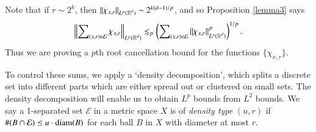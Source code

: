\begin{remark}
    Note that if $r \sim 2^k$, then $\| \chi_{x,r} \|_{L^p(\operatorname{\mathbb{R}}^d)} \sim 2^{k(d-1)/p}$, and so Proposition \ref{lemma3} says
    \begin{equation}
      \left\| \sum\nolimits_{(x,r) \in \mathcal{E}} \chi_{x,r} \right\|_{L^p(\operatorname{\mathbb{R}}^d)} \lesssim_p \left( \sum\nolimits_{(x,r) \in \mathcal{E}} \| \chi_{x,r} \|_{L^p(\operatorname{\mathbb{R}}^d)}^p \right)^{1/p}.
    \end{equation}
    Thus we are proving a $p$th root cancellation bound for the functions $\{ \chi_{x,r} \}$.
\end{remark}

\begin{comment}
\begin{proof}[Proof of Lemma \ref{lemma2} from Lemma \ref{lemma3}]
    Let
    \[ F = \sum\nolimits_{(x,r) \in \mathcal{E}} \chi_{x,r} \]
    and then for $k \geq 1$, let
    \[ F_k = \sum\nolimits_{(x,r) \in \mathcal{E}_k} \chi_{x,r}. \]
    Then $F = \sum\nolimits_k F_k$, and. Applying a dyadic interpolation result (Lemma 2.2 of that paper), the bound
    \[ \| F_k \|_{L^r(\RR^d)} \lesssim 2^k (2^{k(d-r-1)} \#(\mathcal{E}_k)^{1/r}) \]
    which holds for $r$ to the left and right of $p$, can be interpolated to yield that
    \[ \| F \|_{L^p(\RR^d)} \lesssim \left( \sum\nolimits_k 2^{kp} ( 2^{k(d-r-1)} ) \right)^{1/p} \]


    Applying a dyadic interpolation result (Lemma 2.2 of the paper), Lemma \ref{lemma3} implies that
    \[ \left\| \sum\nolimits_{(x,r) \in \mathcal{E}} \chi_{x,r} \right\| \]

    \[ \left\| \sum\nolimits_{(x,r) \in \mathcal{E}} \chi_{x,r} \right\|_{L^p(\RR^d)} \lesssim \left( \sum 2^{kp} 2^{k(d-p-1)} \#(\mathcal{E}_k) \right)^{1/p} = \left( \sum 2^{k(d-1)} \#(\mathcal{E}_k) \right)^{1/p} \]
    This is a restricted strong type bound for Lemma \ref{lemma2}, which we can then interpolate.
\end{proof}
\end{comment}

To control these sums, we apply a `density decomposition', which splits a discrete set into different parts which are either spread out or clustered on small sets. The density decomposition will enable us to obtain $L^p$ bounds from $L^2$ bounds. We say a 1-separated set $\mathcal{E}$ in a metric space $X$ is of \emph{density type} $(u,r)$ if $\#(B \cap \mathcal{E}) \leq u \cdot \operatorname{\text{diam}}(B)$ for each ball $B$ in $X$ with diameter at most $r$.

